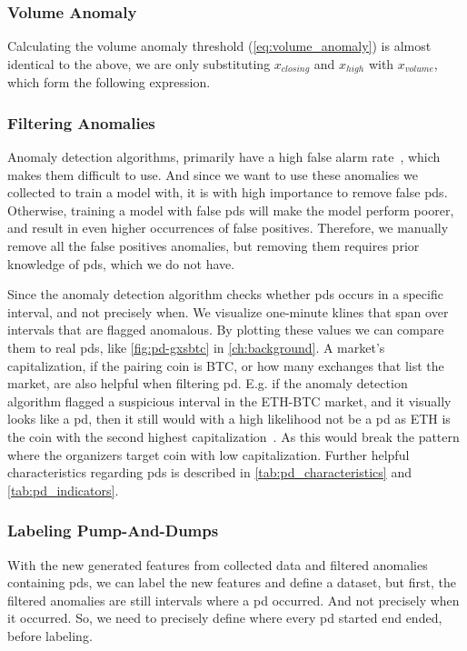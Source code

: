 

\subsubsection{Volume Anomaly}
Calculating the volume anomaly threshold (\autoref{eq:volume_anomaly}) is almost identical to the above, we are only substituting $x_{closing}$ and $x_{high}$ with $x_{volume}$, which form the following expression.



\subsubsection{Filtering Anomalies}
Anomaly detection algorithms, primarily have a high false alarm rate~\cite{grill2017reducing}, which makes them difficult to use. And since we want to use these anomalies we collected to train a model with, it is with high importance to remove false \acp{pd}. Otherwise, training a model with false \acp{pd} will make the model perform poorer, and result in even higher occurrences of false positives. Therefore, we manually remove all the false positives anomalies, but removing them requires prior knowledge of \acp{pd}, which we do not have.

Since the anomaly detection algorithm checks whether \acp{pd} occurs in a specific interval, and not precisely when. We visualize one-minute klines that span over intervals that are flagged anomalous. By plotting these values we can compare them to real \acp{pd}, like \autoref{fig:pd-gxsbtc} in \autoref{ch:background}. A market's capitalization, if the pairing coin is BTC, or how many exchanges that list the market, are also helpful when filtering \ac{pd}. E.g. if the anomaly detection algorithm flagged a suspicious interval in the ETH-BTC market, and it visually looks like a \ac{pd}, then it still would with a high likelihood not be a \ac{pd} as ETH is the coin with the second highest capitalization~\cite{coinmarketcap_eth}.  As this would break the pattern where the organizers target coin with low capitalization. Further helpful characteristics regarding \acp{pd} is described in \autoref{tab:pd_characteristics} and \autoref{tab:pd_indicators}.

\subsubsection{Labeling Pump-And-Dumps}
With the new generated features from collected data and filtered anomalies containing \acp{pd}, we can label the new features and define a dataset, but first, the filtered anomalies are still intervals where a \ac{pd} occurred. And not precisely when it occurred. So, we need to precisely define where every \ac{pd} started end ended, before labeling.

